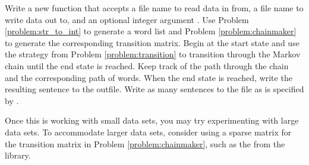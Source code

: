 
\begin{problem}
Write a new function that accepts a file name to read data in from, a file name to write data out to, and an optional integer argument .
Use Problem \ref{problem:str_to_int} to generate a word list and Problem \ref{problem:chainmaker} to generate the corresponding transition matrix.
Begin at the start state and use the strategy from Problem \ref{problem:transition} to transition through the Markov chain until the end state is reached.
Keep track of the path through the chain and the corresponding path of words.
When the end state is reached, write the resulting sentence to the outfile.
Write as many sentences to the file as is specified by .


Once this is working with small data sets, you may try experimenting with large data sets.
To accommodate larger data sets, consider using a sparse matrix for the transition matrix in Problem \ref{problem:chainmaker}, such as the  from the  library.
\end{problem}
